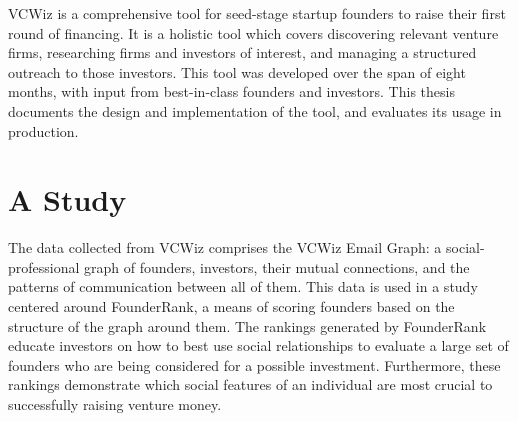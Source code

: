 VCWiz is a comprehensive tool for seed-stage startup founders to raise their first round of financing. It is a holistic tool which covers discovering relevant venture firms, researching firms and investors of interest, and managing a structured outreach to those investors. This tool was developed over the span of eight months, with input from best-in-class founders and investors. This thesis documents the design and implementation of the tool, and evaluates its usage in production.

\section{A Study}

The data collected from VCWiz comprises the VCWiz Email Graph: a social-professional graph of founders, investors, their mutual connections, and the patterns of communication between all of them. This data is used in a study centered around FounderRank, a means of scoring founders based on the structure of the graph around them. The rankings generated by FounderRank educate investors on how to best use social relationships to evaluate a large set of founders who are being considered for a possible investment. Furthermore, these rankings demonstrate which social features of an individual are most crucial to successfully raising venture money.
